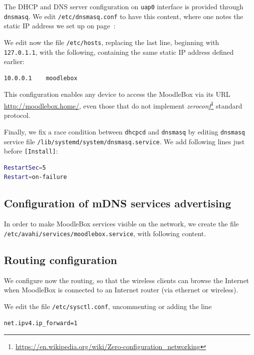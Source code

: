 \documentclass[12pt]{article}
\begin{document}
The DHCP and DNS server configuration on \lstinline{uap0} interface is provided through \lstinline{dnsmasq}.
We edit \lstinline{/etc/dnsmasq.conf} to have this content, where one notes the static IP address we set up on page~\pageref{ssec-static-ip}:



We edit now the file \lstinline{/etc/hosts}, replacing the last line, beginning with \lstinline{127.0.1.1}, with the following, containing the same static IP address defined earlier:
\begin{lstlisting}[language=bash]
10.0.0.1	moodlebox
\end{lstlisting}
This configuration enables any device to access the MoodleBox via its URL \url{http://moodlebox.home/}, even those that do not implement \emph{zeroconf}\footnote{\url{https://en.wikipedia.org/wiki/Zero-configuration_networking}} standard protocol.

Finally, we fix a race condition between \lstinline{dhcpcd} and \lstinline{dnsmasq} by editing \lstinline{dnsmasq} service file \lstinline{/lib/systemd/system/dnsmasq.service}.
We add following lines just before \lstinline{[Install]}:
\begin{lstlisting}[language=bash]
RestartSec=5
Restart=on-failure
\end{lstlisting}

\subsection{Configuration of mDNS services advertising}

In order to make MoodleBox services visible on the network, we create the file \lstinline{/etc/avahi/services/moodlebox.service}, with following content.


\subsection{Routing configuration}

We configure now the routing, so that the wireless clients can browse the Internet when MoodleBox is connected to an Internet router (via ethernet or wireless).

We edit the file \lstinline{/etc/sysctl.conf}, uncommenting or adding the line
\begin{lstlisting}[language=bash]
net.ipv4.ip_forward=1
\end{lstlisting}
\end{document}
